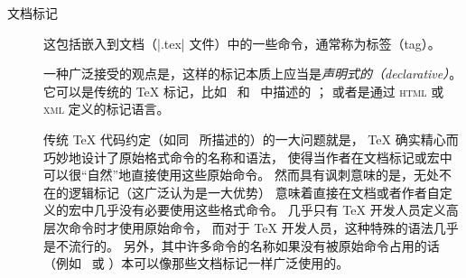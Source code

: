 \documentclass{l3doc}
\providecommand\acro[1]{\textsc{\MakeLowercase{#1}}}
\begin{document}
\begin{description}
%
\item[文档标记] 这包括嵌入到文档（|.tex| 文件）中的一些命令，通常称为标签（tag）。

%
一种广泛接受的观点是，这样的标记本质上应当是\emph{声明式的（declarative）}。
它可以是传统的 \TeX{} 标记，比如~\cite{A-W:LLa94} 和~\cite{A-W:GMS94} 中描述的 \LaTeXe{}；
或者是通过 \acro{HTML} 或 \acro{XML} 定义的标记语言。

传统 \TeX{} 代码约定（如同~\cite{A-W:K-TB} 所描述的）的一大问题就是，
\TeX{} 确实精心而巧妙地设计了原始格式命令的名称和语法，
使得当作者在文档标记或宏中可以很“自然”地直接使用这些原始命令。
然而具有讽刺意味的是，无处不在的逻辑标记（这广泛认为是一大优势）
意味着直接在文档或者作者自定义的宏中几乎没有必要使用这些格式命令。
几乎只有 \TeX{} 开发人员定义高层次命令时才使用原始命令，
而对于 \TeX{} 开发人员，这种特殊的语法几乎是不流行的。
另外，其中许多命令的名称如果没有被原始命令占用的话（例如~ 或 ）本可以像那些文档标记一样广泛使用的。

%
%


\end{description}
\end{document}
